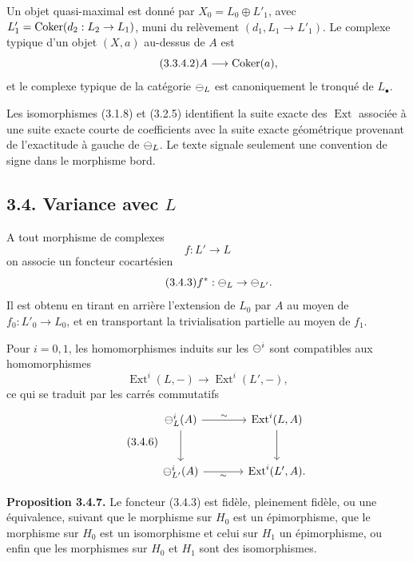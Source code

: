 \documentclass[11pt]{article}
\providecommand{\Ext}{\operatorname{Ext}}
\begin{document}
Un objet quasi-maximal est donn\'e par \(X_0=L_0\oplus L'_1\), avec \(L'_1=\operatorname{Coker}(d_2:L_2\to L_1)\), muni du rel\`evement \((d_1,L_1\to L'_1)\).  Le complexe typique d'un objet \((X,a)\) au-dessus de \(A\) est
\begin{equation}\tag{3.3.4.2}
  A\longrightarrow\operatorname{Coker}(a),
\end{equation}
et le complexe typique de la cat\'egorie \(\mathcal\Psi_L\) est canoniquement le tronqu\'e de \(L_\bullet\).

Les isomorphismes (3.1.8) et (3.2.5) identifient la suite exacte des \(\Ext\) associ\'ee \`a une suite exacte courte de coefficients avec la suite exacte g\'eom\'etrique provenant de l'exactitude \`a gauche de \(\mathcal\Psi_L\).  Le texte signale seulement une convention de signe dans le morphisme bord.

\subsection*{3.4. Variance avec \(L\)}
A tout morphisme de complexes
\begin{equation}\tag{3.4.1}
  f:L'\to L
\end{equation}
on associe un foncteur cocart\'esien
\begin{equation}\tag{3.4.3}
  f^*:\mathcal\Psi_L\to\mathcal\Psi_{L'}.
\end{equation}
Il est obtenu en tirant en arri\`ere l'extension de \(L_0\) par \(A\) au moyen de \(f_0:L'_0\to L_0\), et en transportant la trivialisation partielle au moyen de \(f_1\).

Pour \(i=0,1\), les homomorphismes induits sur les \(\mathcal\Psi^i\) sont compatibles aux homomorphismes
\begin{equation}\tag{3.4.5}
  \Ext^i(L,-)\to\Ext^i(L',-),
\end{equation}
ce qui se traduit par les carr\'es commutatifs
\begin{equation}\tag{3.4.6}
\begin{tikzcd}[column sep=large,row sep=large]
\cPsi_L^i(A)\arrow[r,"\sim"]\arrow[d]&\Ext^i(L,A)\arrow[d]\\
\cPsi_{L'}^i(A)\arrow[r,"\sim"']&\Ext^i(L',A).
\end{tikzcd}
\end{equation}

\textbf{Proposition 3.4.7.}  Le foncteur (3.4.3) est fid\`ele, pleinement fid\`ele, ou une équivalence, suivant que le morphisme sur \(H_0\) est un \'epimorphisme, que le morphisme sur \(H_0\) est un isomorphisme et celui sur \(H_1\) un épimorphisme, ou enfin que les morphismes sur \(H_0\) et \(H_1\) sont des isomorphismes.
\end{document}
